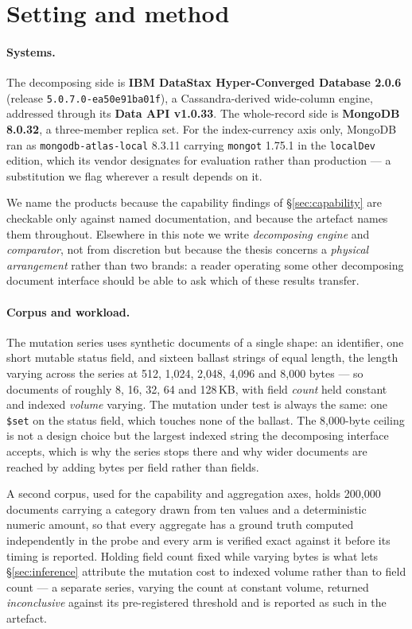 \documentclass[11pt,a4paper]{article}
\newcommand{\code}[1]{\texttt{\small #1}}
\begin{document}
\section{Setting and method}
\label{sec:method}

\paragraph{Systems.} The decomposing side is \textbf{IBM DataStax Hyper-Converged Database 2.0.6}
(release \code{5.0.7.0-ea50e91ba01f}), a Cassandra-derived wide-column engine, addressed through its
\textbf{Data API v1.0.33}. The whole-record side is \textbf{MongoDB 8.0.32}, a three-member replica
set. For the index-currency axis only, MongoDB ran as \code{mongodb-atlas-local} 8.3.11 carrying
\code{mongot} 1.75.1 in the \code{localDev} edition, which its vendor designates for evaluation
rather than production --- a substitution we flag wherever a result depends on it.

We name the products because the capability findings of \S\ref{sec:capability} are checkable only
against named documentation, and because the artefact names them throughout. Elsewhere in this note
we write \emph{decomposing engine} and \emph{comparator}, not from discretion but because the thesis
concerns a \emph{physical arrangement} rather than two brands: a reader operating some other
decomposing document interface should be able to ask which of these results transfer.

\paragraph{Corpus and workload.} The mutation series uses synthetic documents of a single shape:
an identifier, one short mutable status field, and sixteen ballast strings of equal length, the
length varying across the series at 512, 1{,}024, 2{,}048, 4{,}096 and 8{,}000 bytes --- so documents
of roughly 8, 16, 32, 64 and 128\,KB, with field \emph{count} held constant and indexed \emph{volume}
varying. The mutation under test is always the same: one \code{\$set} on the status field, which
touches none of the ballast. The 8{,}000-byte ceiling is not a design choice but the largest indexed
string the decomposing interface accepts, which is why the series stops there and why wider
documents are reached by adding bytes per field rather than fields.

A second corpus, used for the capability and aggregation axes, holds 200{,}000 documents carrying a
category drawn from ten values and a deterministic numeric amount, so that every aggregate has a
ground truth computed independently in the probe and every arm is verified exact against it before
its timing is reported. Holding field count fixed while varying bytes is what lets
\S\ref{sec:inference} attribute the mutation cost to indexed volume rather than to field count --- a
separate series, varying the count at constant volume, returned \emph{inconclusive} against its
pre-registered threshold and is reported as such in the artefact.
\end{document}
